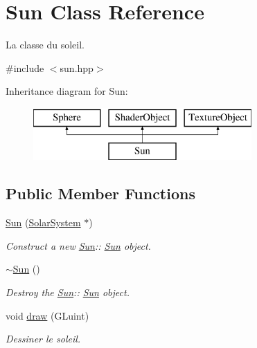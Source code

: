 \hypertarget{classSun}{}\section{Sun Class Reference}
\label{classSun}


La classe du soleil.  




{\ttfamily \#include $<$sun.\+hpp$>$}

Inheritance diagram for Sun\+:\begin{figure}[H]
\begin{center}
\leavevmode
\includegraphics[height=2.000000cm]{classSun}
\end{center}
\end{figure}
\subsection*{Public Member Functions}
\begin{DoxyCompactItemize}
\item 
\mbox{\hyperlink{classSun_ab810283eec5c1921132cd8c2d10db9aa}{Sun}} (\mbox{\hyperlink{classSolarSystem}{Solar\+System}} $\ast$)
\begin{DoxyCompactList}\small\item\em Construct a new \mbox{\hyperlink{classSun}{Sun}}\+:\+: \mbox{\hyperlink{classSun}{Sun}} object. \end{DoxyCompactList}\item 
\mbox{\hyperlink{classSun_a4e43fa67eca98adfb1fa900207af6120}{$\sim$\+Sun}} ()
\begin{DoxyCompactList}\small\item\em Destroy the \mbox{\hyperlink{classSun}{Sun}}\+:\+: \mbox{\hyperlink{classSun}{Sun}} object. \end{DoxyCompactList}\item 
void \mbox{\hyperlink{classSun_a1338daf4028ea9b7526553488c0961e0}{draw}} (G\+Luint)
\begin{DoxyCompactList}\small\item\em Dessiner le soleil. \end{DoxyCompactList}\end{DoxyCompactItemize}
